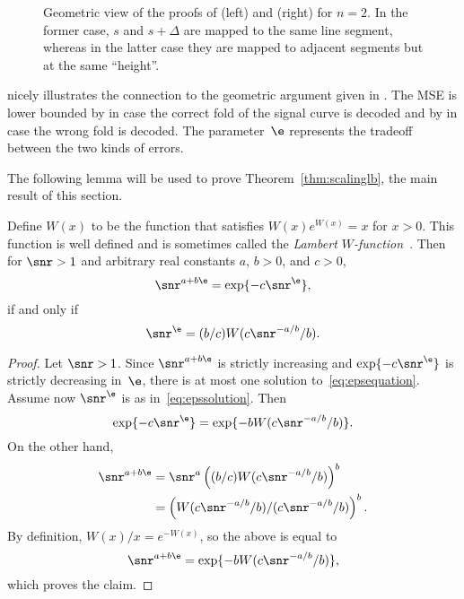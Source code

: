 \begin{figure}
  \centerline{%
  \subfloat[$\Delta \in [0, \beta^{-(n-1)})$ and $s \in \I_j^\Delta$]%
  {\label{fig:sdrubproofa}}%
  \hfil
  \subfloat[$\Delta =
  \beta^{-1}$]{\label{fig:sdrubproofb}}
  } %
  \caption{Geometric view of the proofs of  (left) and
   (right) for $n = 2$. In the former case, $s$ and $s +
  \Delta$ are mapped to the same line segment, whereas in the latter case they
  are mapped to adjacent segments but at the same ``height''.}
  \label{fig:sdrubproof}
\end{figure}

\begin{remark}
  \label{rem:geomlb}
   nicely illustrates the connection to the geometric
  argument given in . The MSE is lower bounded by
   in case the correct fold of the signal curve is decoded
  and by  in case the wrong fold is decoded. The
  parameter~$\e$ represents the tradeoff between the two kinds of errors.
\end{remark}

The following lemma will be used to prove Theorem~\ref{thm:scalinglb}, the main
result of this section.

\begin{lemma}
  \label{lem:epssolution}
  Define $W(x)$ to be the function that satisfies $W(x)e^{W(x)} = x$ for $x >
  0$.  This function is well defined and is sometimes called the \emph{Lambert
  $W$-function}~\textnormal{\cite{CorlessGHJK1996}}. Then for $\snr > 1$ and
  arbitrary real constants $a$, $b>0$, and $c > 0$, 
  \begin{equation}
    \label{eq:epsequation}
    \snr^{a+b\e} = \exp\{-c\snr^\e\},
  \end{equation}
  if and only if
  \begin{equation}
    \label{eq:epssolution}
    \snr^\e = (b/c) W(c\snr^{-a/b} / b).
  \end{equation}
\end{lemma}

\begin{proof}
  Let $\snr>1$. Since $\snr^{a+b\e}$ is strictly increasing and
  $\exp\{-c \snr^\e\}$ is strictly decreasing in~$\e$, there is at most one
  solution to~\eqref{eq:epsequation}.  Assume now $\snr^\e$ is as
  in~\eqref{eq:epssolution}. Then
  \begin{equation*}
    \exp\{-c \snr^\e\} = \exp\{-b W(c \snr^{-a/b}/b)\}.
  \end{equation*}
  On the other hand,
  \begin{align*}
    \snr^{a+b\e} &= \snr^a \left( (b/c) W(c\snr^{-a/b}/b) \right)^b \\
    &= \left( W(c\snr^{-a/b}/b) / (c\snr^{-a/b}/b) \right)^b.
  \end{align*}
  By definition, $W(x)/x = e^{-W(x)}$, so the above is equal to
  \begin{equation*}
    \snr^{a+b\e} = \exp\{-bW(c \snr^{-a/b}/b)\},
  \end{equation*}
  which proves the claim.
\end{proof}

